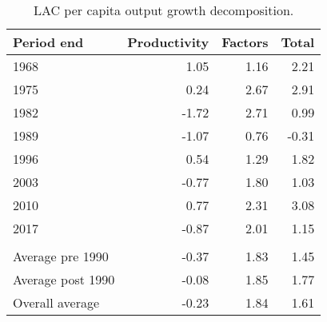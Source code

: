 \begin{table}[!h]

\caption{\label{tab:}LAC per capita output growth decomposition.}
\centering
\begin{tabular}[t]{lrrr}
\toprule
Period end & Productivity & Factors & Total\\
\midrule
1968 & 1.05 & 1.16 & 2.21\\
1975 & 0.24 & 2.67 & 2.91\\
1982 & -1.72 & 2.71 & 0.99\\
1989 & -1.07 & 0.76 & -0.31\\
1996 & 0.54 & 1.29 & 1.82\\
2003 & -0.77 & 1.80 & 1.03\\
2010 & 0.77 & 2.31 & 3.08\\
2017 & -0.87 & 2.01 & 1.15\\
\addlinespace[0.3em]
\multicolumn{4}{l}{\textbf{Averages}}\\
\hspace{1em}Average pre 1990 & -0.37 & 1.83 & 1.45\\
\hspace{1em}Average post 1990 & -0.08 & 1.85 & 1.77\\
\hspace{1em}Overall average & -0.23 & 1.84 & 1.61\\
\bottomrule
\end{tabular}
\end{table}